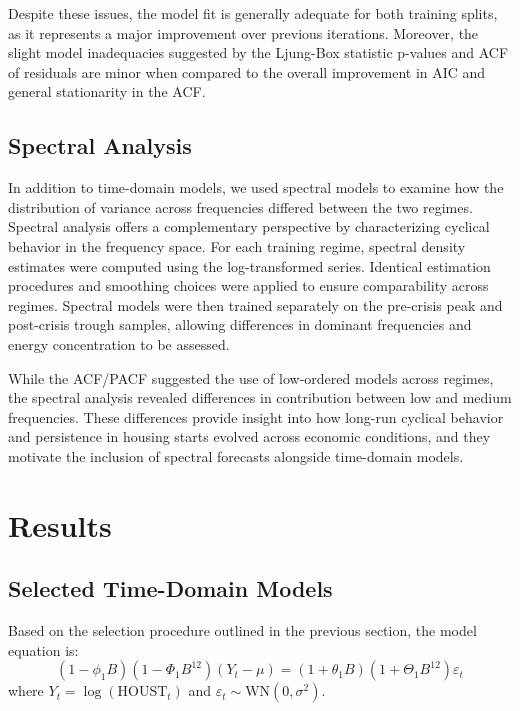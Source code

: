 \documentclass[10pt,twocolumn,letterpaper]{article}
\begin{document}
Despite these issues, the model fit is generally adequate for both training splits, as it represents a major improvement over previous iterations. Moreover, the slight model inadequacies suggested by the Ljung-Box statistic p-values and ACF of residuals are minor when compared to the overall improvement in AIC and general stationarity in the ACF.


\subsection{Spectral Analysis}

In addition to time-domain models, we used spectral models to examine how the distribution of variance across frequencies differed between the two regimes. Spectral analysis offers a complementary perspective by characterizing cyclical behavior in the frequency space. For each training regime, spectral density estimates were computed using the log-transformed series. Identical estimation procedures and smoothing choices were applied to ensure comparability across regimes. Spectral models were then trained separately on the pre-crisis peak and post-crisis trough samples, allowing differences in dominant frequencies and energy concentration to be assessed.

While the ACF/PACF suggested the use of low-ordered models across regimes, the spectral analysis revealed differences in contribution between low and medium frequencies. These differences provide insight into how long-run cyclical behavior and persistence in housing starts evolved across economic conditions, and they motivate the inclusion of spectral forecasts alongside time-domain models.

\section{Results}
\label{sec:results}

\subsection{Selected Time-Domain Models}

Based on the selection procedure outlined in the previous section, the model equation is:
\begin{equation}
(1 - \phi_1 B)(1 - \Phi_1 B^{12})(Y_t - \mu) = (1 + \theta_1 B)(1 + \Theta_1 B^{12})\varepsilon_t
\end{equation}
where $Y_t = \log(\text{HOUST}_t)$ and $\varepsilon_t \sim \text{WN}(0, \sigma^2)$.
\end{document}
